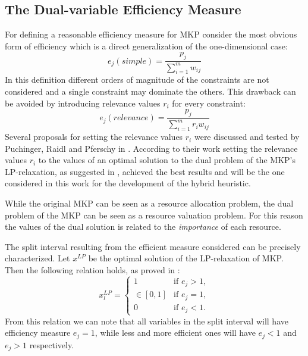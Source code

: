 \subsection{The Dual-variable Efficiency Measure}
\label{subsec:dual}
For defining a reasonable efficiency measure for MKP consider the most obvious
form of efficiency which is a direct generalization of the one-dimensional case:
\begin{equation}
	e_j(simple) = \frac{p_j}{\sum_{i=1}^{m} w_{ij}}
\end{equation}
In this definition different orders of magnitude of the constraints are not
considered and a single constraint may dominate the others.
This drawback can be avoided by introducing relevance values $r_i$ for every
constraint:
\begin{equation}
	e_j(relevance) = \frac{p_j}{\sum_{i=1}^{m} r_i w_{ij}}
\end{equation}
Several proposals for setting the relevance values $r_i$ were discussed and
tested by Puchinger, Raidl and Pferschy in \cite{puchinger2006core}.
According to their work setting the relevance values $r_i$ to the values of an
optimal solution to the dual problem of the MKP's LP-relaxation, as suggested
in \cite{Chu-Beasley-1998}, achieved the best results and will be the one
considered in this work for the development of the hybrid heuristic.

While the original MKP can be seen as a resource allocation problem,
the dual problem of the MKP can be seen as a resource valuation problem.
For this reason the values of the dual solution is related to the
\emph{importance} of each resource.

The split interval resulting from the efficient measure considered can be
precisely characterized.
Let $x^{LP}$ be the optimal solution of the LP-relaxation of MKP.
Then the following relation holds, as proved in \cite{puchinger2006core}:
\begin{displaymath}
 x_l^{LP} =
  \begin{cases}
    1         & \mbox{if } e_j > 1, \\
    \in [0,1] & \mbox{if } e_j = 1, \\
    0         & \mbox{if } e_j < 1.
  \end{cases}
\end{displaymath}
From this relation we can note that all variables in the split interval will
have efficiency measure $e_j = 1$, while less and more efficient ones will have
$e_j < 1$ and $e_j > 1$ respectively.

